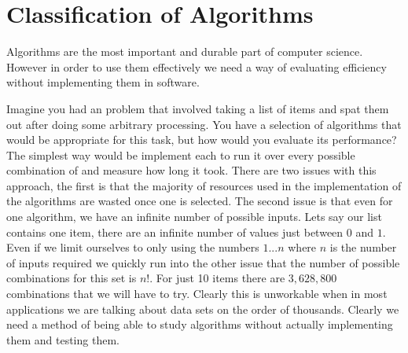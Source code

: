 
\chapter{Classification of Algorithms}
	\begin{statement}
		Algorithms are the most important and durable part of computer science. However in order to use them effectively we need a way of evaluating efficiency without implementing them in software.
		
	\end{statement}


Imagine you had an problem that involved taking a list of items and spat them out after doing some arbitrary processing. You have a selection of algorithms that would be appropriate for this task, but how would you evaluate its performance? The simplest way would be implement each to run it over every possible combination of and measure how long it took. There are two issues with this approach, the first is that the majority of resources used in the implementation of the algorithms are wasted once one is selected. The second issue is that even for one algorithm, we have an infinite number of possible inputs. Lets say our list contains one item, there are an infinite number of values just between $0$ and $1$. Even if we limit ourselves to only using the numbers $1 ... n$ where $n$ is the number of inputs required we quickly run into the other issue that the number of possible combinations for this set is $n!$. For just 10 items there are $3,628,800$ combinations that we will have to try. Clearly this is unworkable when in most applications we are talking about data sets on the order of thousands. Clearly we need a method of being able to study algorithms without actually implementing them and testing them.

